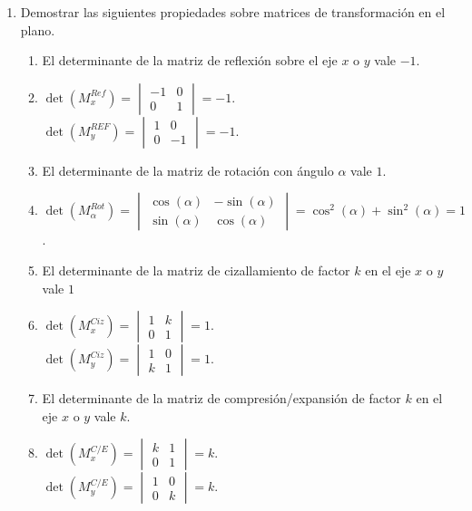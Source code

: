 \documentclass[a4paper]{article}
\newcommand{\answer}{\item[**]}
\newcommand{\exercise}{\item}
\begin{document}
\begin{enumerate}
\begin{enumerate} [label=(\alph*)]
	\end{enumerate}

	\exercise Demostrar las siguientes propiedades sobre matrices de transformación en el plano.
	\begin{enumerate} [label=(\alph*)]

		\item El determinante de la matriz de reflexión sobre el eje $x$ o $y$ vale $-1$.
		\answer $\det(M^{Ref}_x)=\begin{vmatrix} -1 & 0 \\ 0 & 1 \end{vmatrix}=-1$. \\ $\det(M^{REF}_y)=\begin{vmatrix} 1 & 0 \\ 0 & -1 \end{vmatrix}=-1$.  

		\item El determinante de la matriz de rotación con ángulo $\alpha$ vale $1$.
		\answer $\det(M^{Rot}_{\alpha})=\begin{vmatrix} \cos(\alpha) & -\sin(\alpha) \\ \sin(\alpha) & \cos(\alpha) \end{vmatrix}=\cos^2(\alpha)+\sin^2(\alpha)=1$.

		\item El determinante de la matriz de cizallamiento de factor $k$ en el eje $x$ o $y$ vale $1$
		\answer $\det(M^{Ciz}_x)=\begin{vmatrix} 1 & k \\ 0 & 1 \end{vmatrix}=1$.  \\ $\det(M^{Ciz}_y)=\begin{vmatrix} 1 & 0 \\ k & 1 \end{vmatrix}=1$.

		\item El determinante de la matriz de compresión/expansión de factor $k$ en el eje $x$ o $y$ vale $k$.
		\answer $\det(M^{C/E}_x)=\begin{vmatrix} k & 1 \\ 0 & 1 \end{vmatrix}=k$.  \\ $\det(M^{C/E}_y)=\begin{vmatrix} 1 & 0 \\ 0 & k \end{vmatrix}=k$.

	\end{enumerate}



\end{enumerate}
\end{document}
